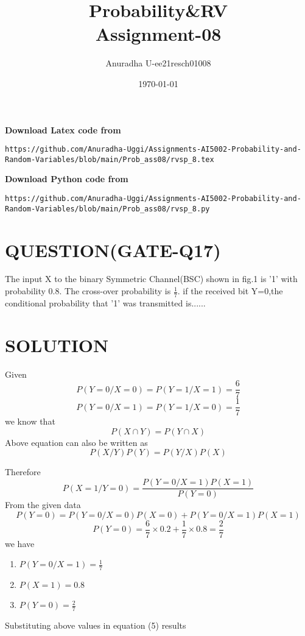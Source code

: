 \documentclass[journal,12pt,twocolumn]{IEEEtran}
\title{Probability\&RV \\ Assignment-08}
\author{Anuradha U-ee21resch01008}
\date{\today}
\begin{document}
\maketitle
\newpage
\bigskip
\renewcommand{\thefigure}{\theenumi}
\renewcommand{\thetable}{\theenumi}


\textbf{Download Latex code from}
\begin{lstlisting}
https://github.com/Anuradha-Uggi/Assignments-AI5002-Probability-and-Random-Variables/blob/main/Prob_ass08/rvsp_8.tex
\end{lstlisting}
\textbf{Download Python code from}
\begin{lstlisting}
https://github.com/Anuradha-Uggi/Assignments-AI5002-Probability-and-Random-Variables/blob/main/Prob_ass08/rvsp_8.py
\end{lstlisting}
\section{\textbf{QUESTION(GATE-Q17)}}
The input X to the binary Symmetric Channel(BSC) shown in fig.1 is '1' with probability 0.8. The cross-over probability is $\frac{1}{7}$. if the received bit Y=0,the conditional probability that '1' was transmitted is......

\section{\textbf{SOLUTION}}
Given 
\begin{equation}
    P(Y=0/X=0)=P(Y=1/X=1)= \frac{6}{7}
\end{equation}
\begin{equation}
   P(Y=0/X=1)=P(Y=1/X=0)=\frac{1}{7}
\end{equation}
we know that
\begin{equation}
    P(X\cap Y)=P(Y\cap X) 
\end{equation}
Above equation can also be written as
\begin{equation}
    P(X/Y)P(Y)=P(Y/X)P(X)
\end{equation}

Therefore
\begin{equation}
    P(X=1/Y=0)=\frac{P(Y=0/X=1)P(X=1)}{P(Y=0)}
\end{equation}
From the given data
\begin{equation}
    P(Y=0)=P(Y=0/X=0)P(X=0)+P(Y=0/X=1)P(X=1)
\end{equation}
\begin{equation}
   P(Y=0)= \frac{6}{7}\times 0.2+\frac{1}{7}\times 0.8=\frac{2}{7}
\end{equation}
we have
\begin{enumerate}
    \item $P(Y=0/X=1)=\frac{1}{7}$
    \item $P(X=1)=0.8$
    \item $P(Y=0)=\frac{2}{7}$
\end{enumerate}
Substituting above values in equation (5) results
\end{document}

